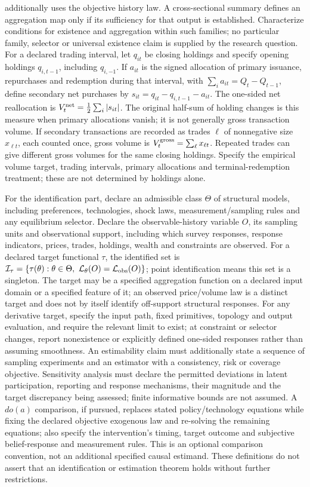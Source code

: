 \documentclass[11pt,a4paper]{article}
\begin{document}
additionally uses the objective history law. A cross-sectional summary defines an aggregation map only if its sufficiency for that output is established. Characterize conditions for existence and aggregation within such families; no particular family, selector or universal existence claim is supplied by the research question. For a declared trading interval, let \(q_{it}\) be closing holdings and specify opening holdings \(q_{i,t-1}\), including \(q_{i,-1}\). If \(a_{it}\) is the signed allocation of primary issuance, repurchases and redemption during that interval, with \(\sum_i a_{it}=Q_t-Q_{t-1}\), define secondary net purchases by \(s_{it}=q_{it}-q_{i,t-1}-a_{it}\). The one-sided net reallocation is \(V_t^{\rm net}=\frac12\sum_i|s_{it}|\). The original half-sum of holding changes is this measure when primary allocations vanish; it is not generally gross transaction volume. If secondary transactions are recorded as trades \(\ell\) of nonnegative size \(x_{\ell t}\), each counted once, gross volume is \(V_t^{\rm gross}=\sum_\ell x_{\ell t}\). Repeated trades can give different gross volumes for the same closing holdings. Specify the empirical volume target, trading intervals, primary allocations and terminal-redemption treatment; these are not determined by holdings alone.

For the identification part, declare an admissible class \(\Theta\) of structural models, including preferences, technologies, shock laws, measurement/sampling rules and any equilibrium selector. Declare the observable-history variable \(O\), its sampling units and observational support, including which survey responses, response indicators, prices, trades, holdings, wealth and constraints are observed. For a declared target functional \(\tau\), the identified set is \(\mathcal I_\tau=\{\tau(\theta):\theta\in\Theta,\ \mathcal L_\theta(O)=\mathcal L_{\rm obs}(O)\}\); point identification means this set is a singleton. The target may be a specified aggregation function on a declared input domain or a specified feature of it; an observed price/volume law is a distinct target and does not by itself identify off-support structural responses. For any derivative target, specify the input path, fixed primitives, topology and output evaluation, and require the relevant limit to exist; at constraint or selector changes, report nonexistence or explicitly defined one-sided responses rather than assuming smoothness. An estimability claim must additionally state a sequence of sampling experiments and an estimator with a consistency, risk or coverage objective. Sensitivity analysis must declare the permitted deviations in latent participation, reporting and response mechanisms, their magnitude and the target discrepancy being assessed; finite informative bounds are not assumed. A \(do(a)\) comparison, if pursued, replaces stated policy/technology equations while fixing the declared objective exogenous law and re-solving the remaining equations; also specify the intervention's timing, target outcome and subjective belief-response and measurement rules. This is an optional comparison convention, not an additional specified causal estimand. These definitions do not assert that an identification or estimation theorem holds without further restrictions.
\end{document}
